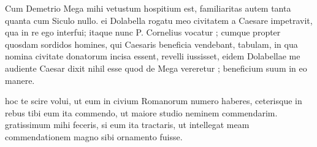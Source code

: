 


 Cum Demetrio Mega mihi vetustum hospitium est, familiaritas autem tanta quanta cum Siculo nullo. ei Dolabella rogatu meo civitatem a Caesare impetravit, qua in re ego interfui; itaque nunc P. Cornelius vocatur ; cumque propter quosdam sordidos homines, qui Caesaris beneficia vendebant, tabulam, in qua nomina civitate donatorum incisa essent, revelli iussisset, eidem Dolabellae me audiente Caesar dixit nihil esse quod de Mega vereretur ; beneficium suum in eo manere.

 hoc te scire volui, ut eum in civium Romanorum numero haberes, ceterisque in rebus tibi eum ita commendo, ut maiore studio neminem commendarim. gratissimum mihi feceris, si eum ita tractaris, ut intellegat meam commendationem magno sibi ornamento fuisse.
